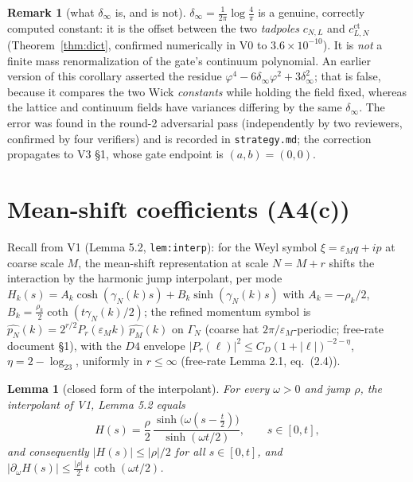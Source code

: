 \documentclass[11pt,a4paper]{article}
\theoremstyle{plain}
\newtheorem{lemma}[theorem]{Lemma}
\theoremstyle{definition}
\newtheorem{remark}[theorem]{Remark}
\newcommand{\eps}{\varepsilon}
\DeclareMathOperator{\cth}{coth}
\DeclareMathOperator{\sh}{sinh}
\begin{document}
\begin{remark}[what $\delta_\infty$ is, and is not]\label{rem:deltarole}
$\delta_\infty=\tfrac1{2\pi}\log\tfrac4\pi$ is a genuine, correctly computed
constant: it is the offset between the two \emph{tadpoles}
$c_{N,L}$ and $c^{\mathrm{ct}}_{L,N}$ (Theorem~\ref{thm:dict}, confirmed
numerically in V0 to $3.6\times10^{-10}$). It is \emph{not} a finite mass
renormalization of the gate's continuum polynomial. An earlier version of
this corollary asserted the residue
$\varphi^4-6\delta_\infty\varphi^2+3\delta_\infty^2$; that is false, because
it compares the two Wick \emph{constants} while holding the field fixed,
whereas the lattice and continuum fields have variances differing by the same
$\delta_\infty$. The error was found in the round-2 adversarial pass
(independently by two reviewers, confirmed by four verifiers) and is recorded
in \texttt{strategy.md}; the correction propagates to V3 \S1, whose gate
endpoint is $(a,b)=(0,0)$.
\end{remark}

\section{Mean-shift coefficients (A4(c))}\label{sec:A4c}

Recall from V1 (Lemma 5.2, \texttt{lem:interp}): for the Weyl symbol
$\xi=\eps_Mq+ip$ at coarse scale $M$, the mean-shift representation at scale
$N=M+r$ shifts the interaction by the harmonic jump interpolant, per mode
$H_k(s)=A_k\cosh(\gamma_N(k)s)+B_k\sh(\gamma_N(k)s)$ with $A_k=-\rho_k/2$,
$B_k=\tfrac{\rho_k}2\cth(t\gamma_N(k)/2)$; the refined momentum symbol is
$\widehat{p_N}(k)=2^{r/2}P_r(\eps_Mk)\,\widehat{p_M}(k)$ on $\Gamma_N$
(coarse hat $2\pi/\eps_M$-periodic; free-rate document \S1), with the $D4$
envelope $|P_r(\ell)|^2\le C_D(1+|\ell|)^{-2-\eta}$, $\eta=2-\log_23$,
uniformly in $r\le\infty$ (free-rate Lemma 2.1, eq.\ (2.4)).

\begin{lemma}[closed form of the interpolant]\label{lem:closed}
For every $\omega>0$ and jump $\rho$, the interpolant of V1, Lemma 5.2
equals
\begin{equation}
 H(s)=\frac\rho2\,\frac{\sh\bigl(\omega(s-\tfrac t2)\bigr)}
 {\sh(\omega t/2)},\qquad s\in[0,t],
 \label{eq:closedform}
\end{equation}
and consequently $|H(s)|\le|\rho|/2$ for all $s\in[0,t]$, and
$|\partial_\omega H(s)|\le\tfrac{|\rho|}2\,t\,\cth(\omega t/2)$.
\end{lemma}
\end{document}
